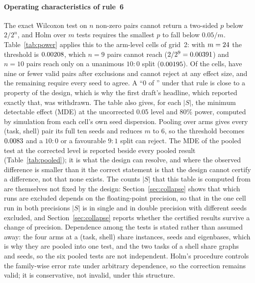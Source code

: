\documentclass[preprint,11pt,3p]{elsarticle}
\begin{document}
\paragraph{Operating characteristics of rule~6}
The exact Wilcoxon test on $n$ non-zero pairs cannot return a two-sided $p$ below $2/2^{n}$, and
Holm over $m$ tests requires the smallest $p$ to fall below $0.05/m$. Table~\ref{tab:power} applies
this to the arm-level cells of grid~2: with $m=24$ the threshold is
$0.00208$, which $n=9$ pairs cannot reach ($2/2^{9}=0.00391$) and $n=10$ pairs
reach only on a unanimous $10{:}0$ split ($0.00195$). Of the \numGthreeArmCells{} cells,
\numPowerCannotReject{} have nine or fewer valid pairs after exclusions and cannot reject at any
effect size, and the remaining \numPowerNeedSweep{} require every seed to agree. A ``0 of
\numGthreeArmCells{}'' under that rule is close to a property of the design, which is why the
first draft's headline, which reported exactly that, was withdrawn. The table also gives, for
each $|S|$, the minimum detectable effect (MDE) at the uncorrected 0.05 level and 80\% power,
computed by simulation from each cell's own seed dispersion. Pooling over arms gives every
(task, shell) pair its full ten seeds and reduces $m$ to 6, so the threshold becomes
$0.0083$ and a $10{:}0$ or a favourable $9{:}1$ split can reject. The MDE of the
pooled test at the corrected level is reported beside every pooled result
(Table~\ref{tab:pooled}); it is what the design can resolve, and where the observed difference is
smaller than it the correct statement is that the design cannot certify a difference, not that
none exists. The counts $|S|$ that this table is computed from are themselves not fixed by the design:
Section~\ref{sec:collapse} shows that which runs are excluded depends on the floating-point
precision, so that in the one cell run in both precisions $|S|$ is \numPrecSThirtyTwo{} in single
and \numPrecSSixtyFour{} in double precision with different seeds excluded, and
Section~\ref{sec:collapse} reports whether the certified results survive a change of precision.
Dependence among the tests is stated rather than assumed away: the four arms at a
(task, shell) share instances, seeds and eigenbases, which is why they are pooled into one test,
and the two tasks of a shell share graphs and seeds, so the six pooled tests are not independent.
Holm's procedure controls the family-wise error rate under arbitrary dependence, so the correction
remains valid; it is conservative, not invalid, under this structure.
\end{document}
